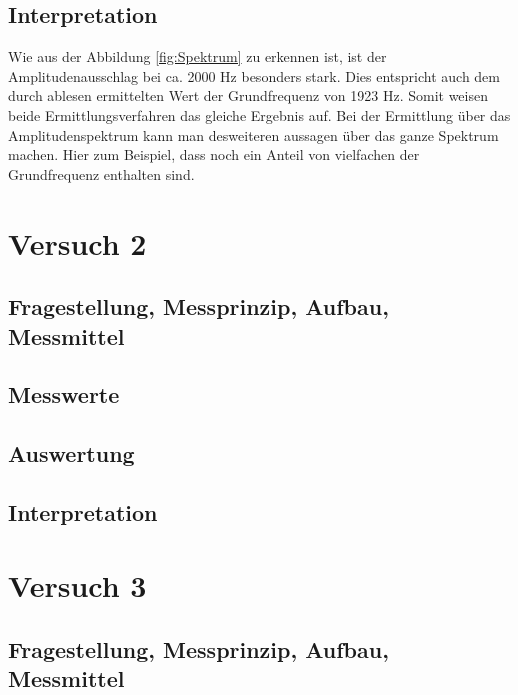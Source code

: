 \documentclass[12pt,oneside,a4paper]{report}
\begin{document}
\section{Interpretation}
\label{chap:VERSUCH_1_INTERPRETATION}
Wie aus der Abbildung \ref{fig:Spektrum} zu erkennen ist, ist der Amplitudenausschlag bei ca. 2000 Hz besonders stark. Dies entspricht auch dem durch ablesen ermittelten Wert der Grundfrequenz von 1923 Hz. Somit weisen beide Ermittlungsverfahren das gleiche Ergebnis auf. Bei der Ermittlung über das Amplitudenspektrum kann man desweiteren aussagen über das ganze Spektrum machen. Hier zum Beispiel, dass noch ein Anteil von vielfachen der Grundfrequenz enthalten sind.

%
%
\chapter{Versuch 2}
\label{chap:VERSUCH_2}


\section{Fragestellung, Messprinzip, Aufbau, Messmittel}
\label{chap:VERSUCH_2_FRAGESTELLUNG}

\section{Messwerte}
\label{chap:VERSUCH_2_MESSWERTE}

\section{Auswertung}
\label{chap:VERSUCH_2_AUSWERTUNG}

\section{Interpretation}
\label{chap:VERSUCH_2_INTERPRETATION}

%
%
\chapter{Versuch 3}
\label{chap:VERSUCH_3}

\section{Fragestellung, Messprinzip, Aufbau, Messmittel}
\label{chap:VERSUCH_3_FRAGESTELLUNG}
\end{document}
